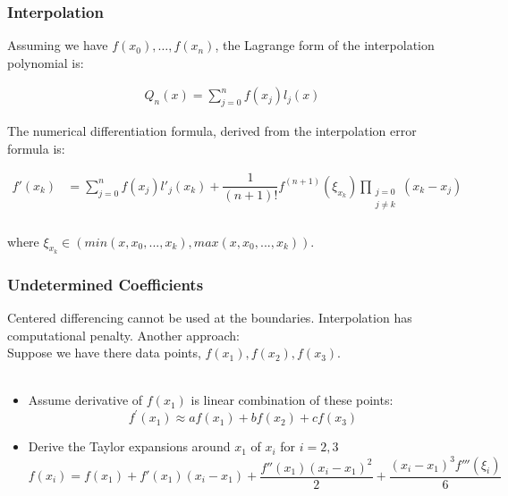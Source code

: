 \documentclass{beamer}
\begin{document}
\begin{frame}
\frametitle{Interpolation}

Assuming we have $f(x_0),\ldots, f(x_n)$, the Lagrange form of the interpolation polynomial is:

\begin{align*}
Q_n(x) = \sum_{j=0}^n f(x_j) l_j(x)
\end{align*}

The numerical differentiation formula, derived from the interpolation error formula is:

\begin{align*}
f'\left( x_{k}\right) &=\sum _{j=0}^{n}f\left( x_{j}\right) l'_{j}\left( x_{k}\right)+\dfrac {1} {\left( n+1\right) !}f^{\left( n+1\right) }\left( \xi _{x_{k}}\right)  \prod _{\substack{j=0\\j\neq k}}\left( x_{k}-x_{j}\right) \\
\end{align*}

where $\xi_{x_k}\in  (min(x, x_0, . . . , x_k), max(x, x_0, . . . , x_k)). $
\end{frame}

\begin{frame}
	\frametitle{Undetermined Coefficients}
	Centered differencing cannot be used at the boundaries. Interpolation has computational penalty. Another approach:\\
	Suppose we have there data points, $f(x_1), f(x_2), f(x_3)$. \\ \hfill\\
	
	\begin{itemize}
		\setlength\itemsep{1em}
		\item Assume derivative of $f(x_1)$ is linear combination of these points:
		\begin{equation*}
				f^\prime(x_1) \approx af(x_1) + bf(x_2) + cf(x_3)
		\end{equation*}
		\item Derive the Taylor expansions around $x_1$ of $x_i$ for $i=2,3$
		\begin{equation*}
			f(x_i) = f(x_1) + f'(x_1)(x_i - x_1) + \frac{f''(x_1)(x_i-x_1)^2}{2}+\frac{(x_i-x_1)^3 f'''(\xi_i)}{6}
		\end{equation*}
		

	\end{itemize}
	
\end{frame}
\end{document}
